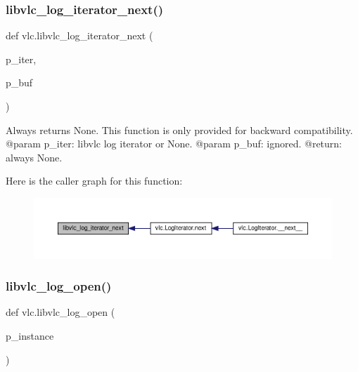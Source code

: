 \subsubsection{\texorpdfstring{libvlc\+\_\+log\+\_\+iterator\+\_\+next()}{libvlc\_log\_iterator\_next()}}
{\footnotesize\ttfamily def vlc.\+libvlc\+\_\+log\+\_\+iterator\+\_\+next (\begin{DoxyParamCaption}\item[{}]{p\+\_\+iter,  }\item[{}]{p\+\_\+buf }\end{DoxyParamCaption})}

\begin{DoxyVerb}Always returns None.
This function is only provided for backward compatibility.
@param p_iter: libvlc log iterator or None.
@param p_buf: ignored.
@return: always None.
\end{DoxyVerb}
 Here is the caller graph for this function\+:
\nopagebreak
\begin{figure}[H]
\begin{center}
\leavevmode
\includegraphics[width=350pt]{namespacevlc_ae704638f284c91d4cb97d6731606dbef_icgraph}
\end{center}
\end{figure}
\mbox{\label{namespacevlc_a03e79554e536d7e5cb215042e619966e}} 
\subsubsection{\texorpdfstring{libvlc\+\_\+log\+\_\+open()}{libvlc\_log\_open()}}
{\footnotesize\ttfamily def vlc.\+libvlc\+\_\+log\+\_\+open (\begin{DoxyParamCaption}\item[{}]{p\+\_\+instance }\end{DoxyParamCaption})}

